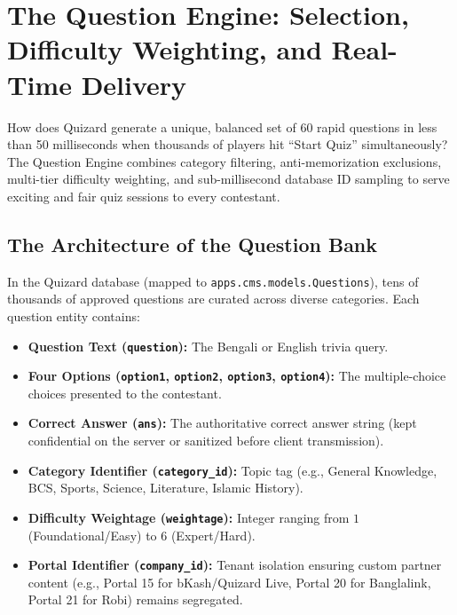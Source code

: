 \chapter{The Question Engine: Selection, Difficulty Weighting, and Real-Time Delivery}

\begin{tcolorbox}[storybox, title={The Question Engine in Brief}]
How does Quizard generate a unique, balanced set of 60 rapid questions in less than 50 milliseconds when thousands of players hit ``Start Quiz'' simultaneously? The Question Engine combines category filtering, anti-memorization exclusions, multi-tier difficulty weighting, and sub-millisecond database ID sampling to serve exciting and fair quiz sessions to every contestant.
\end{tcolorbox}

\section{The Architecture of the Question Bank}
In the Quizard database (mapped to \texttt{apps.cms.models.Questions}), tens of thousands of approved questions are curated across diverse categories. Each question entity contains:

\begin{itemize}
    \item \textbf{Question Text (\texttt{question}):} The Bengali or English trivia query.
    \item \textbf{Four Options (\texttt{option1}, \texttt{option2}, \texttt{option3}, \texttt{option4}):} The multiple-choice choices presented to the contestant.
    \item \textbf{Correct Answer (\texttt{ans}):} The authoritative correct answer string (kept confidential on the server or sanitized before client transmission).
    \item \textbf{Category Identifier (\texttt{category\_id}):} Topic tag (e.g., General Knowledge, BCS, Sports, Science, Literature, Islamic History).
    \item \textbf{Difficulty Weightage (\texttt{weightage}):} Integer ranging from $1$ (Foundational/Easy) to $6$ (Expert/Hard).
    \item \textbf{Portal Identifier (\texttt{company\_id}):} Tenant isolation ensuring custom partner content (e.g., Portal 15 for bKash/Quizard Live, Portal 20 for Banglalink, Portal 21 for Robi) remains segregated.
\end{itemize}

